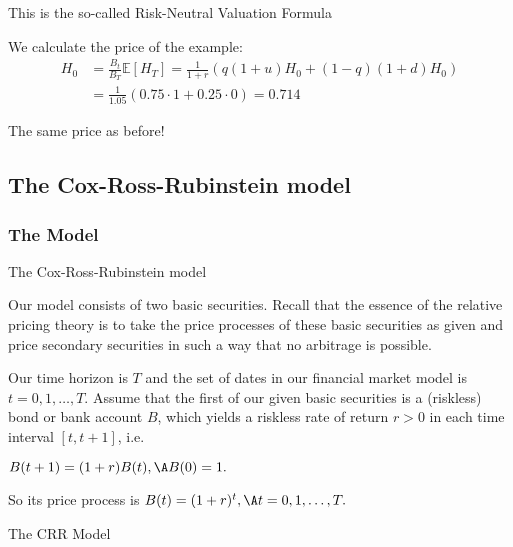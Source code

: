 	This is the so-called Risk-Neutral Valuation Formula
  \vspace{0.3cm}


	We calculate the price of the example:
  \begin{align*}
    H_0 & = \frac{B_t}{B_T} \mathbb{E}[H_T] = \frac{1}{1+r} (q (1+u) H_0 + (1-q) (1+d) H_0) \\
    & = \frac{1}{1.05} (0.75 \cdot 1 + 0.25 \cdot 0) = 0.714
  \end{align*}


	The same price as before!





\subsection{The Cox-Ross-Rubinstein model}
\subsubsection{The Model}

{ The Cox-Ross-Rubinstein model}







	Our model consists of two basic securities. Recall that the essence of the relative pricing theory
is to take the price processes of these basic securities as given
and price secondary securities in such a way that no arbitrage is
possible.


	Our time horizon is $T$ and the set of dates in our financial
market model is $t = 0,1, \ldots, T$. Assume that the first of our
given basic securities is a (riskless) bond or bank account $B$,
which yields a riskless rate of return $r >0$ in each time
interval $[t,t+1]$, i.e.






	$B(t+1)=(1+r)B(t),\A B(0)=1.$






	So its price process is $ B(t) = (1+r)^t, \A t = 0,1, \ldots, T. $





{ The CRR Model}







